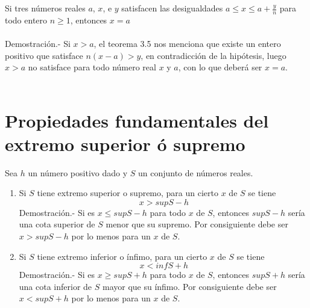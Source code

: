 \begin{teo}
Si tres números reales $a$, $x$, e $y$ satisfacen las desigualdades $a\leq x \leq a+\displaystyle\frac{y}{n}$ para todo entero $n \geq 1$, entonces $x=a$\\\\
Demostración.- \; Si $x>a$, el teorema 3.5 nos menciona que existe un entero positivo que satisface $n(x-a)>y$, en contradicción de la hipótesis, luego $x>a$ no satisface para todo número real $x$ y $a$, con lo que deberá ser $x=a$.\\\\
\end{teo} 
\setcounter{section}{11}
\section*{Propiedades fundamentales del extremo superior ó supremo}
\begin{teo}
Sea $h$ un número positivo dado y $S$ un conjunto de números reales.
\begin{enumerate}[\bfseries a)]
\item Si $S$ tiene extremo superior o supremo, para un cierto $x$ de $S$ se tiene 
$$x>supS-h$$
Demostración.- \; Si es $x\leq supS -h$ para todo $x$ de $S$, entonces $supS-h$ sería una cota superior de $S$ menor que su supremo. Por consiguiente debe ser $x>supS-h$ por lo menos para un $x$ de $S$.
\item Si $S$ tiene extremo inferior o ínfimo, para un cierto $x$ de $S$ se tiene 
$$x<infS+h$$
Demostración.- \; Si es $x \geq supS+h$ para todo $x$ de $S$, entonces $supS+h$ sería una cota inferior de $S$ mayor que su ínfimo. Por consiguiente debe ser $x<supS+h$ por lo menos para un $x$ de $S$.
\end{enumerate}
\end{teo}

